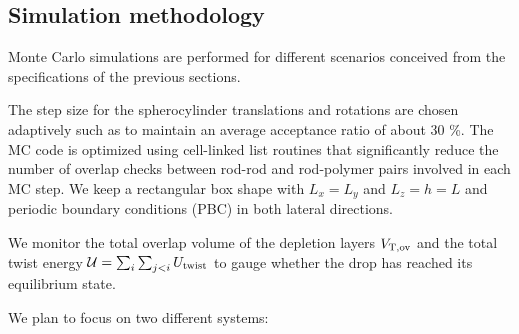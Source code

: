\subsection{Simulation methodology} %

Monte Carlo simulations are performed for different scenarios conceived from the specifications of the previous sections.

The step size for the spherocylinder translations and rotations are chosen adaptively such as to maintain an average acceptance ratio of about 30 \%. The MC code is optimized using cell-linked list routines that significantly reduce the number of overlap checks between rod-rod and rod-polymer pairs involved in  each MC step. We keep a rectangular box shape with $L_{x} = L_{y}$ and $L_{z} = h = L$ and periodic boundary conditions (PBC) in both lateral directions.

We monitor the total overlap volume of the depletion layers $V_{\rm T, ov}$ and the total twist energy $\mathcal{U}  = \sum_{i}\sum_{j<i}U_{\rm twist}$ to gauge whether the drop has reached its equilibrium state.

We plan to focus on two different systems:

